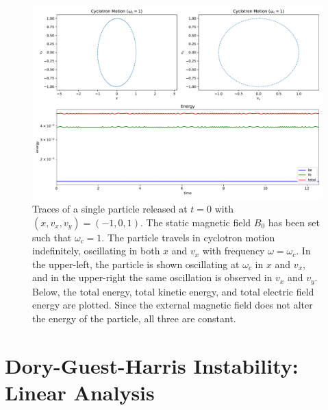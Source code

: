 \documentclass[%
 reprint,
 amsmath,amssymb,
 aps,
]{revtex4-2}
\begin{document}
\begin{figure}
\includegraphics[width=0.9\linewidth]{proj4/traces_1_particles.pdf}
\caption{\label{fig:cyclotron-motion-demo}Traces of a single particle released at $t=0$ with $(x, v_x, v_y) = (-1, 0, 1)$. The static magnetic field $B_0$ has been set such that $\omega_c = 1$. The particle travels in cyclotron motion indefinitely, oscillating in both $x$ and $v_x$ with frequency $\omega = \omega_c$. In the upper-left, the particle is shown oscillating at $\omega_c$ in $x$ and $v_x$, and in the upper-right the same oscillation is observed in $v_x$ and $v_y$. Below, the total energy, total kinetic energy, and total electric field energy are plotted. Since the external magnetic field does not alter the energy of the particle, all three are constant.}
\end{figure}

\section{Dory-Guest-Harris Instability: Linear Analysis}
\end{document}

